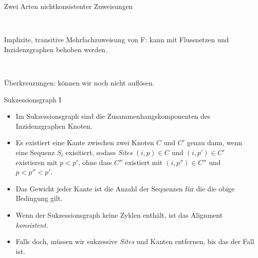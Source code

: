 \documentclass[wide,xcolor={x11names},hyperref={colorlinks=false},pantone312]{beamer}
\begin{document}
\begin{frame}[t, fragile]{Zwei Arten nichtkonsistenter Zuweisungen}
	\tiny
	\begin{center}
	 \\
	\end{center}
	\small
	Implizite, transitive Mehrfachzuweisung von F: kann mit Flussnetzen und Inzidenzgraphen behoben werden. \\
	\tiny
	\begin{center}
	 \\
	\end{center}
	\small
	Überkreuzungen: können wir noch nicht auflösen.
	\normalsize
\end{frame}

\begin{frame}[t]{Sukzessionsgraph I}
	\small
	\begin{itemize}
		\item Im Sukzessionsgraph sind die Zusammenhangskomponenten des Inzidenzgraphen Knoten. \cite{PDC10}
		\item Es existiert eine Kante zwischen zwei Knoten $C$ und $C'$ genau dann, wenn eine Sequenz $S_i$ exisitiert, sodass \emph{Sites} $(i,p) \in C$ und $(i,p') \in C'$ existieren mit $p < p'$, ohne dass $C''$ existiert mit $(i,p'') \in C''$ und $p < p'' < p'$.
		\item Das Gewicht jeder Kante ist die Anzahl der Sequenzen für die die obige Bedingung gilt. \pause
		\item Wenn der Sukzessionsgraph keine Zyklen enthält, ist das Alignment \emph{konsistent}.
		\item Falls doch, müssen wir sukzessive \emph{Sites} und Kanten entfernen, bis das der Fall ist.
	\end{itemize}
	\normalsize
\end{frame}
\end{document}
